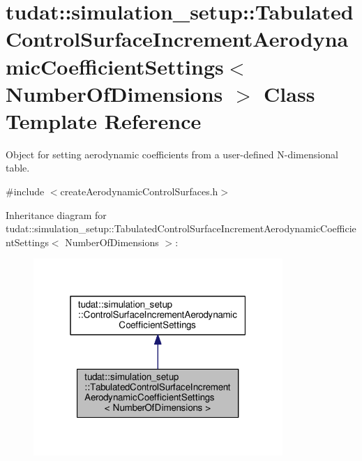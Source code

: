 \hypertarget{classtudat_1_1simulation__setup_1_1TabulatedControlSurfaceIncrementAerodynamicCoefficientSettings}{}\section{tudat\+:\+:simulation\+\_\+setup\+:\+:Tabulated\+Control\+Surface\+Increment\+Aerodynamic\+Coefficient\+Settings$<$ Number\+Of\+Dimensions $>$ Class Template Reference}
\label{classtudat_1_1simulation__setup_1_1TabulatedControlSurfaceIncrementAerodynamicCoefficientSettings}


Object for setting aerodynamic coefficients from a user-\/defined N-\/dimensional table.  




{\ttfamily \#include $<$create\+Aerodynamic\+Control\+Surfaces.\+h$>$}



Inheritance diagram for tudat\+:\+:simulation\+\_\+setup\+:\+:Tabulated\+Control\+Surface\+Increment\+Aerodynamic\+Coefficient\+Settings$<$ Number\+Of\+Dimensions $>$\+:
\nopagebreak
\begin{figure}[H]
\begin{center}
\leavevmode
\includegraphics[width=268pt]{classtudat_1_1simulation__setup_1_1TabulatedControlSurfaceIncrementAerodynamicCoefficientSettings__inherit__graph}
\end{center}
\end{figure}


